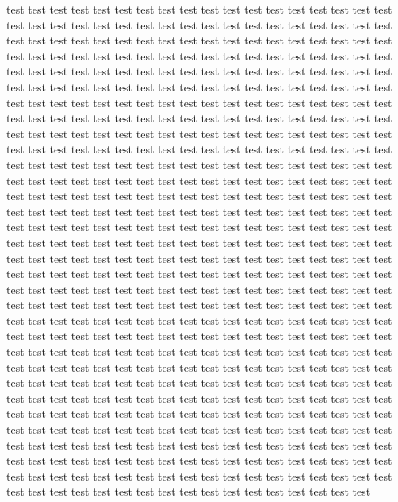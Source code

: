 \documentclass{report}
\begin{document}
test test test test test test test test test test test test test test
test test test test test test test test test test test test test test
test test test test test test test test test test test test test test
test test test test test test test test test test test test test test
test test test test test test test test test test test test test test
test test test test test test test test test test test test test test
test test test test test test test test test test test test test test
test test test test test test test test test test test test test test
test test test test test test test test test test test test test test
test test test test test test test test test test test test test test
test test test test test test test test test test test test test test
test test test test test test test test test test test test test test
test test test test test test test test test test test test test test
test test test test test test test test test test test test test test
test test test test test test test test test test test test test test
test test test test test test test test test test test test test test
test test test test test test test test test test test test test test
test test test test test test test test test test test test test test
test test test test test test test test test test test test test test
test test test test test test test test test test test test test test
test test test test test test test test test test test test test test
test test test test test test test test test test test test test test
test test test test test test test test test test test test test test
test test test test test test test test test test test test test test
test test test test test test test test test test test test test test
test test test test test test test test test test test test test test
test test test test test test test test test test test test test test
test test test test test test test test test test test test test test
test test test test test test test test test test test test test test
test test test test test test test test test test test test test test
test test test test test test test test test test test test test test
test test test test test test test test test test test test test test
test test test test test test test test test test test test test test
test test test test test test test test test test test test test test
test test test test test test test test test test test test test test
test test test test test test test test test test test test test test
test test test test test test test test test test test test test test
test test test test test test test test test test test test test test
test test test test test test test test test test test test test test
test test test test test test test test test test test test test test
test test test test test test test test test test test test test test
test
\end{document}
